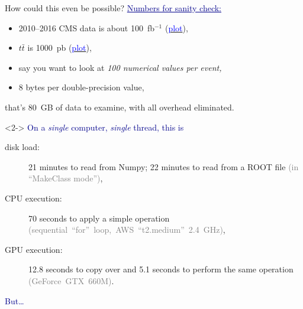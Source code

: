 \documentclass{beamer}
\begin{document}
\begin{frame}{How could this even be possible?}
\vspace{0.5 cm}
\large \textcolor{darkblue}{\underline{Numbers for sanity check:}}
\begin{itemize}
\item 2010--2016 CMS data is about 100~fb$^{-1}$ (\href{http://cms-service-lumi.web.cern.ch/cms-service-lumi/publicplots/int_lumi_cumulative_pp_1.png}{\textcolor{blue}{plot}}),
\item $t\bar{t}$ is 1000~pb (\href{https://atlas.web.cern.ch/Atlas/GROUPS/PHYSICS/CombinedSummaryPlots/SM/ATLAS_p_SMSummary_SqrtS_Zoom/ATLAS_p_SMSummary_SqrtS_Zoom.png}{\textcolor{blue}{plot}}),
\item say you want to look at {\it 100 numerical values per event,}
\item 8 bytes per double-precision value,
\end{itemize}
that's 80~GB of data to examine, with all overhead eliminated.

\vspace{0.4 cm}
\begin{uncoverenv}<2->
\textcolor{darkblue}{On a {\it single} computer, {\it single} thread, this is}
\begin{description}
\item[disk load:] 21 minutes to read from Numpy; 22 minutes to read from a ROOT file \textcolor{gray}{(in ``MakeClass mode'')},
\item[CPU execution:] 70 seconds to apply a simple operation \mbox{\textcolor{gray}{(sequential ``for'' loop, AWS ``t2.medium'' 2.4 GHz)},\hspace{-1 cm}}
\item[GPU execution:] 12.8 seconds to copy over and 5.1 seconds to perform the same operation \mbox{\textcolor{gray}{(GeForce GTX 660M)}.\hspace{-1 cm}}
\end{description}
\end{uncoverenv}
\end{frame}

\begin{frame}{}
\begin{center}
\textcolor{darkblue}{\huge But\ldots}
\end{center}
\end{frame}
\end{document}
